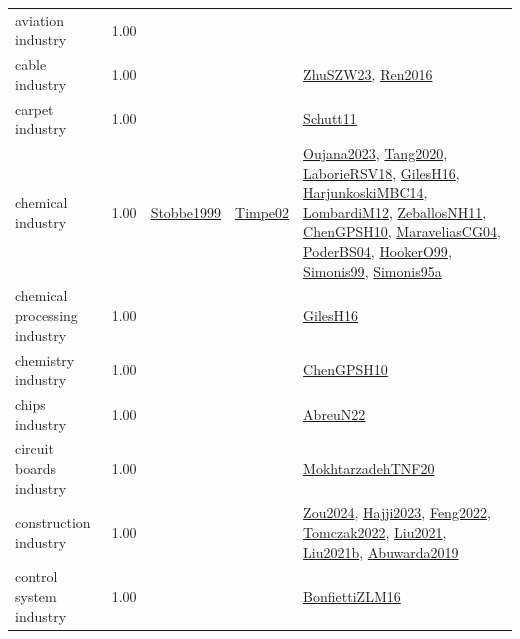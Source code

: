 {\begin{longtable}{p{3cm}r>{\raggedright\arraybackslash}p{6cm}>{\raggedright\arraybackslash}p{6cm}>{\raggedright\arraybackslash}p{8cm}}
\index{aviation industry}\index{Industries!aviation industry}aviation industry &  1.00 &  &  & \\
\index{cable industry}\index{Industries!cable industry}cable industry &  1.00 &  &  & \hyperref[detail:ZhuSZW23]{ZhuSZW23}, \hyperref[detail:Ren2016]{Ren2016}\\
\index{carpet industry}\index{Industries!carpet industry}carpet industry &  1.00 &  &  & \hyperref[detail:Schutt11]{Schutt11}\\
\index{chemical industry}\index{Industries!chemical industry}chemical industry &  1.00 & \hyperref[detail:Stobbe1999]{Stobbe1999} & \hyperref[detail:Timpe02]{Timpe02} & \hyperref[detail:Oujana2023]{Oujana2023}, \hyperref[detail:Tang2020]{Tang2020}, \hyperref[detail:LaborieRSV18]{LaborieRSV18}, \hyperref[detail:GilesH16]{GilesH16}, \hyperref[detail:HarjunkoskiMBC14]{HarjunkoskiMBC14}, \hyperref[detail:LombardiM12]{LombardiM12}, \hyperref[detail:ZeballosNH11]{ZeballosNH11}, \hyperref[detail:ChenGPSH10]{ChenGPSH10}, \hyperref[detail:MaraveliasCG04]{MaraveliasCG04}, \hyperref[detail:PoderBS04]{PoderBS04}, \hyperref[detail:HookerO99]{HookerO99}, \hyperref[detail:Simonis99]{Simonis99}, \hyperref[detail:Simonis95a]{Simonis95a}\\
\index{chemical processing industry}\index{Industries!chemical processing industry}chemical processing industry &  1.00 &  &  & \hyperref[detail:GilesH16]{GilesH16}\\
\index{chemistry industry}\index{Industries!chemistry industry}chemistry industry &  1.00 &  &  & \hyperref[detail:ChenGPSH10]{ChenGPSH10}\\
\index{chips industry}\index{Industries!chips industry}chips industry &  1.00 &  &  & \hyperref[detail:AbreuN22]{AbreuN22}\\
\index{circuit boards industry}\index{Industries!circuit boards industry}circuit boards industry &  1.00 &  &  & \hyperref[detail:MokhtarzadehTNF20]{MokhtarzadehTNF20}\\
\index{construction industry}\index{Industries!construction industry}construction industry &  1.00 &  &  & \hyperref[detail:Zou2024]{Zou2024}, \hyperref[detail:Hajji2023]{Hajji2023}, \hyperref[detail:Feng2022]{Feng2022}, \hyperref[detail:Tomczak2022]{Tomczak2022}, \hyperref[detail:Liu2021]{Liu2021}, \hyperref[detail:Liu2021b]{Liu2021b}, \hyperref[detail:Abuwarda2019]{Abuwarda2019}\\
\index{control system industry}\index{Industries!control system industry}control system industry &  1.00 &  &  & \hyperref[detail:BonfiettiZLM16]{BonfiettiZLM16}\\

\end{longtable}}
